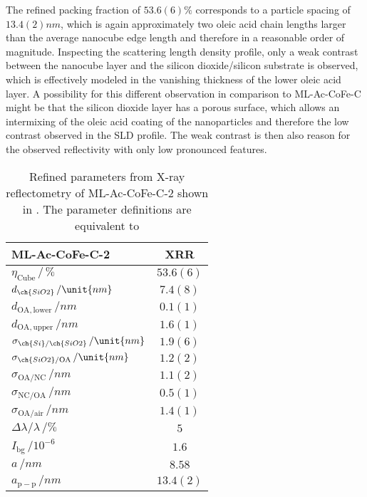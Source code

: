 \documentclass[\main/dresen_thesis.tex]{subfiles}
\begin{document}
  The refined packing fraction of $53.6(6) \%$ corresponds to a particle spacing of $13.4(2) \unit{nm}$, which is again approximately two oleic acid chain lengths larger than the average nanocube edge length and therefore in a reasonable order of magnitude.
  Inspecting the scattering length density profile, only a weak contrast between the nanocube layer and the silicon dioxide/silicon substrate is observed, which is effectively modeled in the vanishing thickness of the lower oleic acid layer.
  A possibility for this different observation in comparison to ML-Ac-CoFe-C might be that the silicon dioxide layer has a porous surface, which allows an intermixing of the oleic acid coating of the nanoparticles and therefore the low contrast observed in the SLD profile.
  The weak contrast is then also reason for the observed reflectivity with only low pronounced features.

  \begin{table}[!htbp]
    \centering
    \caption{\label{tab:monolayers:structure:squareArrayParacrystal:XRR}Refined parameters from X-ray reflectometry of ML-Ac-CoFe-C-2 shown in . The parameter definitions are equivalent to }
    \begin{tabular}{l | c}
      \hline
      ML-Ac-CoFe-C-2 & \textbf{XRR}\\
      \hline
      $\eta_\mathrm{Cube} \, /\, \%$                  & $53.6(6)$ \\
      $d_{\ch{SiO2}} \, / \unit{nm}$                  & $7.4(8)$ \\
      $d_{\mathrm{OA, lower}}\, / \unit{nm}$          & $0.1(1)$\\
      $d_{\mathrm{OA, upper}}\, / \unit{nm}$          & $1.6(1)$ \\
      $\sigma_{\ch{Si}/\ch{SiO2}} \, / \unit{nm}$     & $1.9(6)$ \\
      $\sigma_{\ch{SiO2}/\mathrm{OA}}\, / \unit{nm}$  & $1.2(2)$ \\
      $\sigma_\mathrm{OA/NC} \, / \unit{nm}$          & $1.1(2)$ \\
      $\sigma_\mathrm{NC/OA} \, / \unit{nm}$          & $0.5(1)$ \\
      $\sigma_\mathrm{OA/air} \, / \unit{nm}$         & $1.4(1)$ \\
      \hline
      $\Delta \lambda / \lambda\, / \unit{\%}$        & $5$ \\
      $I_\mathrm{bg} \, / \unit{10^{-6}}$             & $1.6$\\
      \hline
      $a \, / \unit{nm}$ & $8.58$ \\
      \hline
      $a_\mathrm{p-p} \, / \unit{nm}$ & $13.4(2)$ \\
      \hline
    \end{tabular}
  \end{table}
\end{document}

